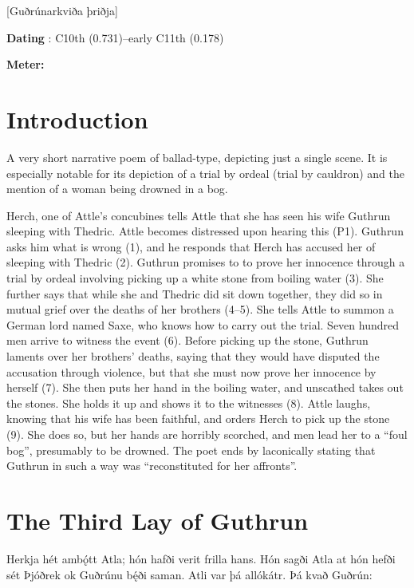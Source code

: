 [Guðrúnarkviða þriðja]

\begin{flushright}%
\textbf{Dating} \parencite{Sapp2022}: C10th (0.731)–early C11th (0.178)

\textbf{Meter:} \Fornyrdislag%
\end{flushright}

\section{Introduction}

A very short narrative poem of ballad-type, depicting just a single scene.  It is especially notable for its depiction of a trial by ordeal (trial by cauldron) and the mention of a woman being drowned in a bog.

Herch, one of Attle’s concubines tells Attle that she has seen his wife Guthrun sleeping with Thedric. Attle becomes distressed upon hearing this (P1). Guthrun asks him what is wrong (1), and he responds that Herch has accused her of sleeping with Thedric (2). Guthrun promises to to prove her innocence through a trial by ordeal involving picking up a white stone from boiling water (3). She further says that while she and Thedric did sit down together, they did so in mutual grief over the deaths of her brothers (4–5). She tells Attle to summon a German lord named Saxe, who knows how to carry out the trial. Seven hundred men arrive to witness the event (6). Before picking up the stone, Guthrun laments over her brothers’ deaths, saying that they would have disputed the accusation through violence, but that she must now prove her innocence by herself (7). She then puts her hand in the boiling water, and unscathed takes out the stones. She holds it up and shows it to the witnesses (8). Attle laughs, knowing that his wife has been faithful, and orders Herch to pick up the stone (9). She does so, but her hands are horribly scorched, and men lead her to a “foul bog”, presumably to be drowned. The poet ends by laconically stating that Guthrun in such a way was “reconstituted for her affronts”.

\sectionline

\section{The Third Lay of Guthrun}

\bpg\bpa Herkja hét ambǫ́tt Atla; hón hafði verit frilla hans. Hón sagði Atla at hón hefði sét Þjóðrek ok Guðrúnu bę́ði saman. Atli var þá allókátr. Þá kvað Guðrún:\epa

